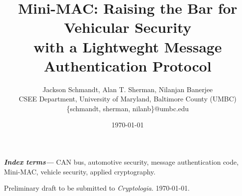 \documentclass[10pt,twocolumn]{article}
\providecommand{\keywords}[1]{\textbf{\textit{Index terms---}} #1}
\begin{document}
\title{Mini-MAC: Raising the Bar for Vehicular Security\\
with a Lightweght Message Authentication Protocol}



\author{Jackson Schmandt\footnotemark[1]\footnotemark[2], 
Alan T. Sherman\footnotemark[1], 
Nilanjan Banerjee\footnotemark[2]\\
CSEE Department, University of Maryland, Baltimore County (UMBC)\\
\{schmandt, sherman, nilanb\}@umbc.edu\\}

\date{\today}

\maketitle




\keywords{CAN bus,
	automotive security,
	message authentication code,
	Mini-MAC,
	vehicle security,
	applied cryptography.
}
















	









\bigskip \noindent
Preliminary draft to be submitted to {\it Cryptologia}. {\today}.
\end{document}
